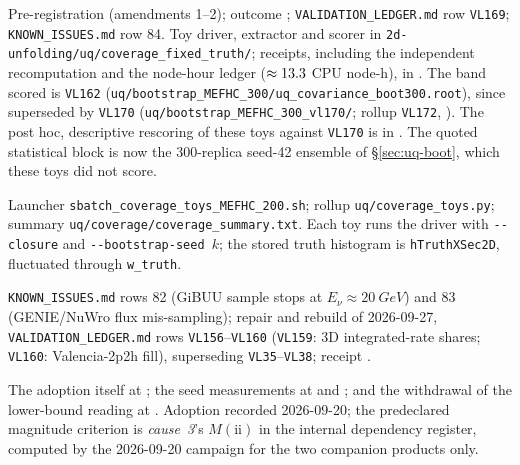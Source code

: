 \begin{description}[leftmargin=0pt,itemsep=3pt]
  \item[\texttt{coverage-fixed-truth}.] Pre-registration  (amendments 1--2); outcome ; \texttt{VALIDATION\_LEDGER.md} row \texttt{VL169}; \texttt{KNOWN\_ISSUES.md} row 84. Toy driver, extractor and scorer in \texttt{2d-unfolding/}\allowbreak\texttt{uq/}\allowbreak\texttt{coverage\_fixed\_truth/}; receipts, including the independent recomputation and the node-hour ledger ($\approx13.3$ CPU node-h), in . The band scored is \texttt{VL162} (\texttt{uq/bootstrap\_MEFHC\_300/uq\_covariance\_boot300.root}), since superseded by \texttt{VL170} (\texttt{uq/bootstrap\_MEFHC\_300\_vl170/}; rollup \texttt{VL172}, ). The post hoc, descriptive rescoring of these toys against \texttt{VL170} is in . The quoted statistical block is now the 300-replica seed-42 ensemble of \S\ref{sec:uq-boot}, which these toys did not score.
  \item[\texttt{coverage-toys}.] Launcher \texttt{sbatch\_coverage\_toys\_MEFHC\_200.sh}; rollup \texttt{uq/coverage\_toys.py}; summary \texttt{uq/coverage/}\allowbreak\texttt{coverage\_summary.txt}. Each toy runs the driver with \texttt{-{}-closure} and \texttt{-{}-bootstrap-seed $k$}; the stored truth histogram is \texttt{hTruthXSec2D}, fluctuated through \texttt{w\_truth}.
  \item[\texttt{flux-repair}.] \texttt{KNOWN\_ISSUES.md} rows 82 (GiBUU sample stops at $E_\nu\approx\SI{20}{GeV}$) and 83 (GENIE/NuWro flux mis-sampling); repair and rebuild of 2026-09-27, \texttt{VALIDATION\_LEDGER.md} rows \texttt{VL156}--\texttt{VL160} (\texttt{VL159}: 3D integrated-rate shares; \texttt{VL160}: Valencia-2p2h fill), superseding \texttt{VL35}--\texttt{VL38}; receipt .
  \item[\texttt{z-cv-record}.] The adoption itself at ; the seed measurements at  and ; and the withdrawal of the lower-bound reading at . Adoption recorded 2026-09-20; the predeclared magnitude criterion is \emph{cause~3}'s $M(\mathrm{ii})$ in the internal dependency register, computed by the 2026-09-20 campaign for the two companion products only.

\end{description}
